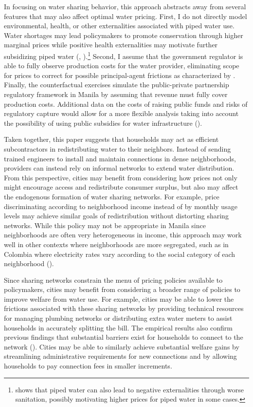 \documentclass[12pt]{article}
\begin{document}
In focusing on water sharing behavior, this approach abstracts away from several features that may also affect optimal water pricing.  First, I do not directly model environmental, health, or other externalities associated with piped water use.  Water shortages may lead policymakers to promote conservation through higher marginal prices while positive health externalities may motivate further subsidizing piped water (\cite{timmins2002measuring}, \cite{galiani2005water}).\footnote{\cite{bennett2012does} shows that piped water can also lead to negative externalities through worse sanitation, possibly motivating higher prices for piped water in some cases.}  Second, I assume that the government regulator is able to fully observe production costs for the water provider, eliminating scope for prices to correct for possible principal-agent frictions as characterized by \cite{laffont1993theory}.  Finally, the counterfactual exercises simulate the public-private partnership regulatory framework in Manila by assuming that revenue must fully cover production costs.  Additional data on the costs of raising public funds and risks of regulatory capture would allow for a more flexible analysis taking into account the possibility of using public subsidies for water infrastructure (\cite{laffont2005regulation}).  

Taken together, this paper suggests that households may act as efficient subcontractors in redistributing water to their neighbors.  Instead of sending trained engineers to install and maintain connections in dense neighborhoods, providers can instead rely on informal networks to extend water distribution.  From this perspective, cities may benefit from considering how prices not only might encourage access and redistribute consumer surplus, but also may affect the endogenous formation of water sharing networks.  For example, price discriminating according to neighborhood income instead of by monthly usage levels may achieve similar goals of redistribution without distorting sharing networks.  While this policy may not be appropriate in Manila since neighborhoods are often very heterogeneous in income, this approach may work well in other contexts where neighborhoods are more segregated, such as in Colombia where electricity rates vary according to the social category of each neighborhood (\cite{mcrae2014infrastructure}).  

Since sharing networks constrain the menu of pricing policies available to policymakers, cities may benefit from considering a broader range of policies to improve welfare from water use.  For example, cities may be able to lower the frictions associated with these sharing networks by providing technical resources for managing plumbing networks or distributing extra water meters to assist households in accurately splitting the bill.  The empirical results also confirm previous findings that substantial barriers exist for households to connect to the network (\cite{devoto2012happiness}).  Cities may be able to similarly achieve substantial welfare gains by streamlining administrative requirements for new connections and by allowing households to pay connection fees in smaller increments.  
\end{document}
